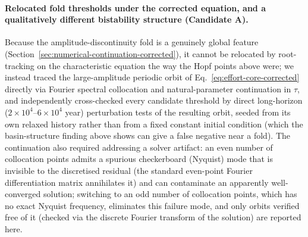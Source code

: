 \documentclass[twocolumn,10pt]{article}
\begin{document}
\paragraph{Relocated fold thresholds under the corrected equation, and a qualitatively different bistability structure (Candidate A).} Because the amplitude-discontinuity fold is a genuinely global feature (Section~\ref{sec:numerical-continuation-corrected}), it cannot be relocated by root-tracking on the characteristic equation the way the Hopf points above were; we instead traced the large-amplitude periodic orbit of Eq.~\eqref{eq:effort-core-corrected} directly via Fourier spectral collocation and natural-parameter continuation in $\tau$, and independently cross-checked every candidate threshold by direct long-horizon ($2\times10^4$--$6\times10^4$ year) perturbation tests of the resulting orbit, seeded from its own relaxed history rather than from a fixed constant initial condition (which the basin-structure finding above shows can give a false negative near a fold). The continuation also required addressing a solver artifact: an even number of collocation points admits a spurious checkerboard (Nyquist) mode that is invisible to the discretised residual (the standard even-point Fourier differentiation matrix annihilates it) and can contaminate an apparently well-converged solution; switching to an odd number of collocation points, which has no exact Nyquist frequency, eliminates this failure mode, and only orbits verified free of it (checked via the discrete Fourier transform of the solution) are reported here.
\end{document}
